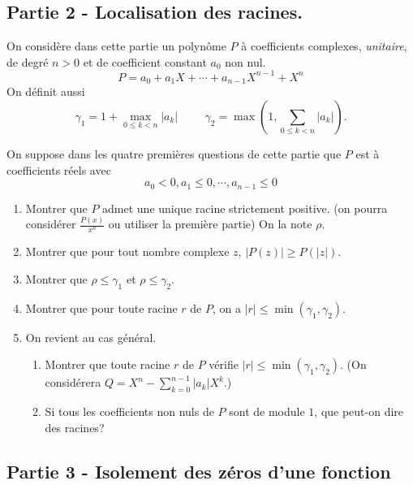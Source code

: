 \subsection*{Partie 2 - Localisation des racines.}
On consid{\`e}re dans cette partie un polyn{\^o}me $P$ {\`a} coefficients complexes, \emph{unitaire}, de degr{\'e} $n>0$ et de coefficient constant $a_0$ non nul.
    \[P=a_0+a_1 X + \cdots + a_{n-1}X^{n-1}+X^{n}\]
    On d{\'e}finit aussi
\begin{displaymath}
\gamma_1 = 1+\max_{0\leq k <n} | a_k | \hspace{1cm}  \gamma_2 = \max(1,\sum_{0\leq k <n} | a_k |) .
\end{displaymath}

On suppose dans les quatre premi{\`e}res questions de cette partie que $P$ est {\`a} coefficients r{\'e}els avec
    \[a_0<0, a_1\leq 0, \cdots , a_{n-1}\leq 0 \]

\begin{enumerate}
    \item Montrer que $P$ admet une unique racine strictement positive. (on pourra consid{\'e}rer $\frac{P(x)}{x^n}$ ou utiliser la première partie) On la note $\rho$.

    \item Montrer que pour tout nombre complexe $z$, $|P(z)|\geq P(|z|)$.

    \item Montrer que $\rho \leq \gamma_1$ et $\rho \leq \gamma_2$.

    \item Montrer que pour toute racine $r$ de $P$, on a $| r | \leq \min(\gamma_1,\gamma_2)$.
    \item On revient au cas g{\'e}n{\'e}ral.
\begin{enumerate}
\item Montrer que toute racine $r$ de $P$ v{\'e}rifie $| r | \leq \min(\gamma_1,\gamma_2)$. (On consid{\'e}rera $Q= X^n - \sum_{k=0}^{n-1} | a_k | X^k$.)
\item Si tous les coefficients non nuls de $P$ sont de module $1$, que peut-on dire des racines?
\end{enumerate}

\end{enumerate}

\subsection*{Partie 3 - Isolement des z{\'e}ros d'une fonction}

